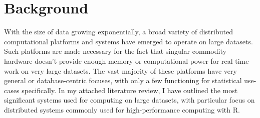 \documentclass[a4paper,10pt]{article}
\begin{document}

\tableofcontents

\section{Background}

With the size of data growing exponentially, a broad variety of distributed
computational platforms and systems have emerged to operate on large datasets.
Such platforms are made necessary for the fact that singular commodity hardware
doesn't provide enough memory or computational power for real-time work on very
large datasets.
The vast majority of these platforms have very general or database-centric
focuses, with only a few functioning for statistical use-cases specifically.
In my attached literature review, I have outlined the most significant systems
used for computing on large datasets, with particular focus on distributed
systems commonly used for high-performance computing with R.
\end{document}
